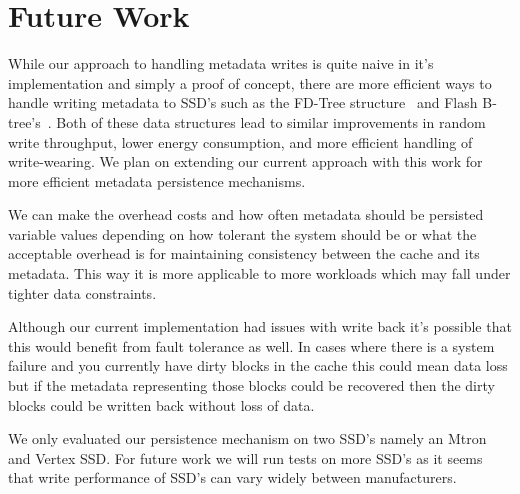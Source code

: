 \section{Future Work}
\label{sec:future}

While our approach to handling metadata writes is quite naive in it's
implementation and simply a proof of concept, there are more efficient
ways to handle writing metadata to SSD's such as the FD-Tree
structure~\cite{FD-Tree} and Flash B-tree's~\cite{FlashB-Tree}. Both
of these data structures lead to similar improvements in random write
throughput, lower energy consumption, and more efficient handling of
write-wearing. We plan on extending our current approach with this
work for more efficient metadata persistence mechanisms.

We can make the overhead costs and how often metadata should be
persisted variable values depending on how tolerant the system should
be or what the acceptable overhead is for maintaining consistency
between the cache and its metadata. This way it is more applicable to
more workloads which may fall under tighter data constraints.

Although our current implementation had issues with write back it's
possible that this would benefit from fault tolerance as well. In
cases where there is a system failure and you currently have dirty
blocks in the cache this could mean data loss but if the metadata
representing those blocks could be recovered then the dirty blocks
could be written back without loss of data.

We only evaluated our persistence mechanism on two SSD's namely an
Mtron and Vertex SSD. For future work we will run tests on more SSD's
as it seems that write performance of SSD's can vary widely between
manufacturers.
